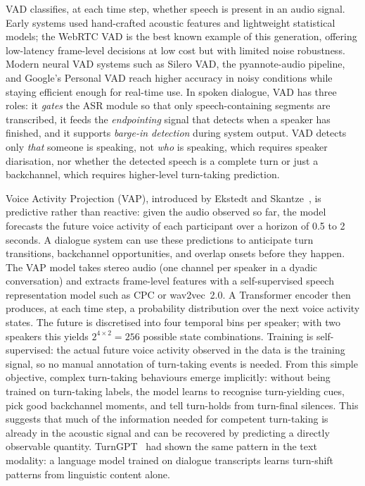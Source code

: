 VAD classifies, at each time step, whether speech is present in an audio signal. Early systems used hand-crafted acoustic features and lightweight statistical models; the WebRTC VAD is the best known example of this generation, offering low-latency frame-level decisions at low cost but with limited noise robustness. Modern neural VAD systems such as Silero VAD, the pyannote-audio pipeline, and Google's Personal VAD reach higher accuracy in noisy conditions while staying efficient enough for real-time use. In spoken dialogue, VAD has three roles: it \emph{gates} the ASR module so that only speech-containing segments are transcribed, it feeds the \emph{endpointing} signal that detects when a speaker has finished, and it supports \emph{barge-in detection} during system output. VAD detects only \emph{that} someone is speaking, not \emph{who} is speaking, which requires speaker diarisation, nor whether the detected speech is a complete turn or just a backchannel, which requires higher-level turn-taking prediction.

Voice Activity Projection (VAP), introduced by Ekstedt and Skantze~\cite{ekstedt2022vap}, is predictive rather than reactive: given the audio observed so far, the model forecasts the future voice activity of each participant over a horizon of 0.5 to 2 seconds. A dialogue system can use these predictions to anticipate turn transitions, backchannel opportunities, and overlap onsets before they happen. The VAP model takes stereo audio (one channel per speaker in a dyadic conversation) and extracts frame-level features with a self-supervised speech representation model such as CPC or wav2vec~2.0. A Transformer encoder then produces, at each time step, a probability distribution over the next voice activity states. The future is discretised into four temporal bins per speaker; with two speakers this yields $2^{4 \times 2} = 256$ possible state combinations. Training is self-supervised: the actual future voice activity observed in the data is the training signal, so no manual annotation of turn-taking events is needed. From this simple objective, complex turn-taking behaviours emerge implicitly: without being trained on turn-taking labels, the model learns to recognise turn-yielding cues, pick good backchannel moments, and tell turn-holds from turn-final silences. This suggests that much of the information needed for competent turn-taking is already in the acoustic signal and can be recovered by predicting a directly observable quantity. TurnGPT~\cite{ekstedt2020turngpt} had shown the same pattern in the text modality: a language model trained on dialogue transcripts learns turn-shift patterns from linguistic content alone.

